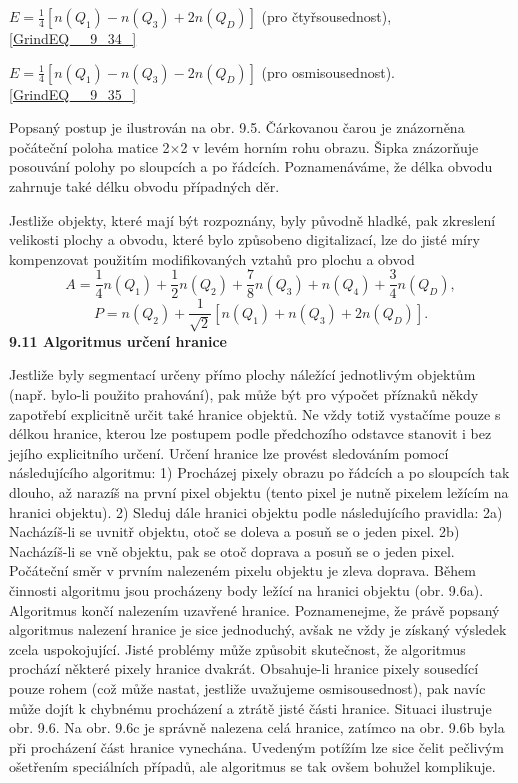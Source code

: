  $E=\frac{1}{4} \left[n\left(Q_{1} \right)-n\left(Q_{3} \right)+2n\left(Q_{D} \right)\right]$   (pro čtyřsousednost), \eqref{GrindEQ__9_34_}

 $E=\frac{1}{4} \left[n\left(Q_{1} \right)-n\left(Q_{3} \right)-2n\left(Q_{D} \right)\right]$   (pro osmisousednost). \eqref{GrindEQ__9_35_}

\noindent Popsaný postup je ilustrován na obr. 9.5. Čárkovanou čarou je znázorněna počáteční poloha matice 2$\times$2 v levém horním rohu obrazu. Šipka znázorňuje posouvání polohy po sloupcích a po řádcích. Poznamenáváme, že délka obvodu zahrnuje také délku obvodu případných děr.

\noindent    

\noindent Jestliže objekty, které mají být rozpoznány, byly původně hladké, pak zkreslení velikosti plochy a obvodu, které bylo způsobeno digitalizací, lze do jisté míry kompenzovat použitím modifikovaných vztahů pro plochu a obvod
\begin{equation} \label{GrindEQ__9_36_} 
A=\frac{1}{4} n\left(Q_{1} \right)+\frac{1}{2} n\left(Q_{2} \right)+\frac{7}{8} n\left(Q_{3} \right)+n\left(Q_{4} \right)+\frac{3}{4} n\left(Q_{D} \right),  
\end{equation} 
\begin{equation} \label{GrindEQ__9_37_} 
P=n\left(Q_{2} \right)+\frac{1}{\sqrt{2} } \left[n\left(Q_{1} \right)+n\left(Q_{3} \right)+2n\left(Q_{D} \right)\right].  
\end{equation} 
\textbf{9.11  Algoritmus určení hranice}

\noindent 

\noindent Jestliže byly segmentací určeny přímo plochy náležící jednotlivým objektům (např. bylo-li použito prahování), pak může být pro výpočet příznaků někdy zapotřebí explicitně určit také hranice objektů. Ne vždy totiž vystačíme pouze s délkou hranice, kterou lze postupem podle předchozího odstavce stanovit i bez jejího explicitního určení. Určení hranice lze provést sledováním pomocí následujícího algoritmu: 1) Procházej pixely obrazu po řádcích a po sloupcích tak dlouho, až narazíš na první pixel objektu (tento pixel je nutně pixelem ležícím na hranici objektu). 2) Sleduj dále hranici objektu podle následujícího pravidla: 2a) Nacházíš-li se uvnitř objektu, otoč se doleva a posuň se o jeden pixel. 2b) Nacházíš-li se vně objektu, pak se otoč doprava a posuň se o jeden pixel. Počáteční směr v prvním nalezeném pixelu objektu je zleva doprava. Během činnosti algoritmu jsou procházeny body ležící na hranici objektu (obr. 9.6a). Algoritmus končí nalezením uzavřené hranice. Poznamenejme, že právě popsaný algoritmus nalezení hranice je sice jednoduchý, avšak ne vždy je získaný výsledek zcela uspokojující. Jisté problémy může způsobit skutečnost, že algoritmus prochází některé pixely hranice dvakrát. Obsahuje-li hranice pixely sousedící pouze rohem (což může nastat, jestliže uvažujeme osmisousednost), pak navíc může dojít k chybnému procházení a ztrátě jisté části hranice. Situaci ilustruje obr. 9.6. Na obr. 9.6c je správně nalezena celá hranice, zatímco na obr. 9.6b byla při procházení část hranice vynechána. Uvedeným potížím lze sice čelit pečlivým ošetřením speciálních případů, ale algoritmus se tak ovšem bohužel komplikuje.

